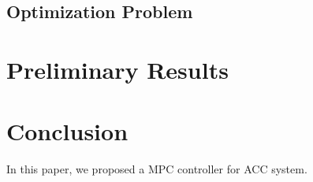 \documentclass{article}
\numberwithin{equation}{section}
\begin{document}
\subsection{Optimization Problem}

\section{Preliminary Results}
\section{Conclusion}

In this paper, we proposed a MPC controller for ACC system.



\end{document}

